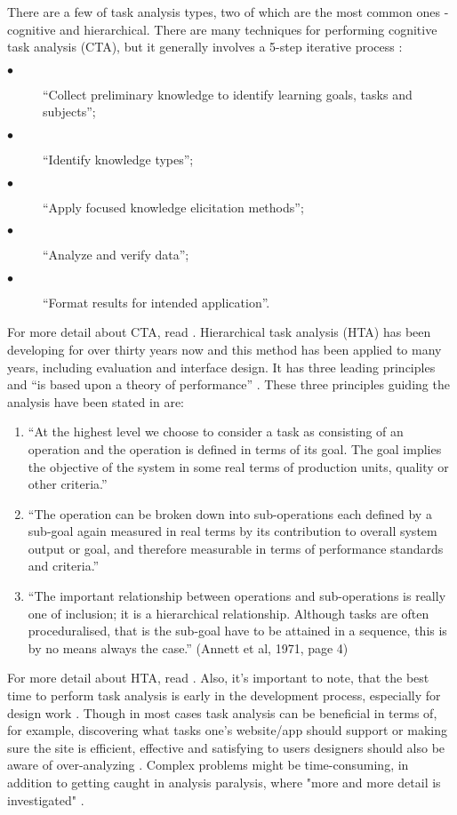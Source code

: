 \documentclass{scrartcl}
\begin{document}
There are a few of task analysis types, two of which are the most common ones - cognitive and hierarchical. There are many techniques for performing cognitive task analysis (CTA), but it generally involves a 5-step iterative process \cite{horn2017adapting} \cite{jonassen2008handbook}:

\begin{description}
  \item[$\bullet$] ``Collect preliminary knowledge to identify learning goals, tasks and subjects'';
  \item[$\bullet$] ``Identify knowledge types'';
  \item[$\bullet$] ``Apply focused knowledge elicitation methods'';
  \item[$\bullet$] ``Analyze and verify data'';
  \item[$\bullet$] ``Format results for intended application''.
\end{description}

For more detail about CTA, read \cite{horn2017adapting}. Hierarchical task analysis (HTA) has been developing for over thirty years now and this method has been applied to many years, including evaluation and interface design. It has three leading principles and ``is based upon a theory of performance'' \cite{stanton2006hierarchical}. These three principles guiding the analysis have been stated in \cite{annett1971} are:

\begin{enumerate}
  \item ``At the highest level we choose to consider a task as consisting of an operation and the operation is defined in terms of its goal. The goal implies the objective of the system in some real terms of production units, quality or other criteria.''
  \item ``The operation can be broken down into sub-operations each defined by a sub-goal again measured in real terms by its contribution to overall system output or goal, and therefore measurable in terms of performance standards and criteria.''
  \item ``The important relationship between operations and sub-operations is really one of inclusion; it is a hierarchical relationship. Although tasks are often proceduralised, that is the sub-goal have to be attained in a sequence, this is by no means always the case.'' (Annett et al, 1971, page 4)
\end{enumerate}

For more detail about HTA, read \cite{stanton2006hierarchical}. Also, it's important to note, that the best time to perform task analysis is early in the development process, especially for design work \cite{usabilityta}. Though in most cases task analysis can be beneficial in terms of, for example, discovering what tasks one's website/app should support or making sure the site is efficient, effective and satisfying to users designers should also be aware of over-analyzing \cite{usabilitybokta}. Complex problems might be time-consuming, in addition to getting caught in analysis paralysis, where "more and more detail is investigated" \cite{usabilitybokta}.
\end{document}
